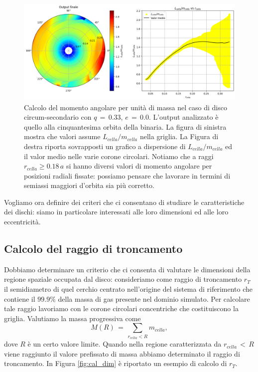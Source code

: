 \begin{figure}[h]
    \centering
    \includegraphics[width=\textwidth]{Immagini/Simulazioni/cal_moma.png}
    \caption{Calcolo del momento angolare per unità di massa nel caso di disco circum-secondario con $q\,=\,0.33$, $e\,=\,0.0$. L'output analizzato è quello alla cinquantesima orbita della binaria. La figura di sinistra mostra che valori assume $L_{cella}/m_{cella}$ nella griglia. La Figura di destra riporta sovrapposti un grafico a dispersione di $L_{cella}/m_{cella}$ ed il valor medio nelle varie corone circolari. Notiamo che a raggi $r_{cella} \geq 0.18\,a$ si hanno diversi valori di momento angolare per posizioni radiali fissate: possiamo pensare che lavorare in termini di semiassi maggiori d'orbita sia più corretto.}
    \label{fig:moma_grid}
\end{figure}

Vogliamo ora definire dei criteri che ci consentano di studiare le caratteristiche dei dischi: siamo in particolare interessati alle loro dimensioni ed alle loro eccentricità.

\subsection{Calcolo del raggio di troncamento}

Dobbiamo determinare un criterio che ci consenta di valutare le dimensioni della regione spaziale occupata dal disco: consideriamo come raggio di troncamento $r_T$ il semidiametro di quel cerchio centrato nell'origine del sistema di riferimento che contiene il $99.9 \%$ della massa di gas presente nel dominio simulato. Per calcolare tale raggio lavoriamo con le corone circolari concentriche che costituiscono la griglia. Valutiamo la massa progressiva come
\begin{equation}
M(R)\,=\,\sum_{r_{cella}<R} m_{cella},
\label{eq:m_prog}
\end{equation}
dove $R$ è un certo valore limite. Quando nella regione caratterizzata da $r_{cella}\,<\,R$ viene raggiunto il valore prefissato di massa abbiamo determinato il raggio di troncamento. In Figura \ref{fig:cal_dim} è riportato un esempio di calcolo di $r_T$.

